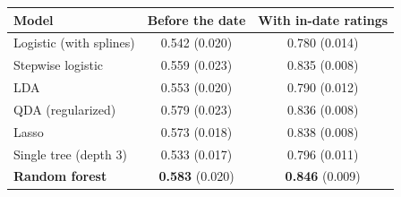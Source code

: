 \begin{tabular}{lcc}
\toprule
Model & Before the date & With in-date ratings \\
\midrule
Logistic (with splines) & 0.542 (0.020) & 0.780 (0.014) \\
Stepwise logistic & 0.559 (0.023) & 0.835 (0.008) \\
LDA & 0.553 (0.020) & 0.790 (0.012) \\
QDA (regularized) & 0.579 (0.023) & 0.836 (0.008) \\
Lasso & 0.573 (0.018) & 0.838 (0.008) \\
Single tree (depth 3) & 0.533 (0.017) & 0.796 (0.011) \\
\textbf{Random forest} & \textbf{0.583} (0.020) & \textbf{0.846} (0.009) \\
\bottomrule
\end{tabular}
